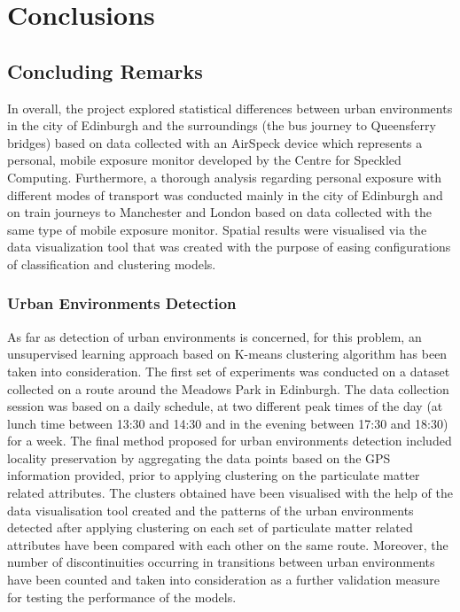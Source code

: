 \documentclass[bsc,frontabs,twoside,singlespacing, parskip,deptreport]{infthesis}     %
\begin{document}
\chapter{Conclusions}

\section{Concluding Remarks}

In overall, the project explored statistical differences between urban environments in the city of Edinburgh and the surroundings (the bus journey to Queensferry bridges) based on data collected with an AirSpeck device which represents a personal, mobile exposure monitor developed by the Centre for Speckled Computing. Furthermore, a thorough analysis regarding personal exposure with different modes of transport was conducted mainly in the city of Edinburgh and on train journeys to Manchester and London based on data collected with the same type of mobile exposure monitor. Spatial results were visualised via the data visualization tool that was created with the purpose of easing configurations of classification and clustering models.

\subsection{Urban Environments Detection}

As far as detection of urban environments is concerned, for this problem, an unsupervised learning approach based on K-means clustering algorithm has been taken into consideration. The first set of experiments was conducted on a dataset collected on a route around the Meadows Park in Edinburgh. The data collection session was based on a daily schedule, at two different peak times of the day (at lunch time between 13:30 and 14:30 and in the evening between 17:30 and 18:30) for a week. The final method proposed for urban environments detection included locality preservation by aggregating the data points based on the GPS information provided, prior to applying clustering on the particulate matter related attributes. The clusters obtained have been visualised with the help of the data visualisation tool created and the patterns of the urban environments detected after applying clustering on each set of particulate matter related attributes have been compared with each other on the same route. Moreover, the number of discontinuities occurring in transitions between urban environments have been counted and taken into consideration as a further validation measure for testing the performance of the models.
\end{document}
